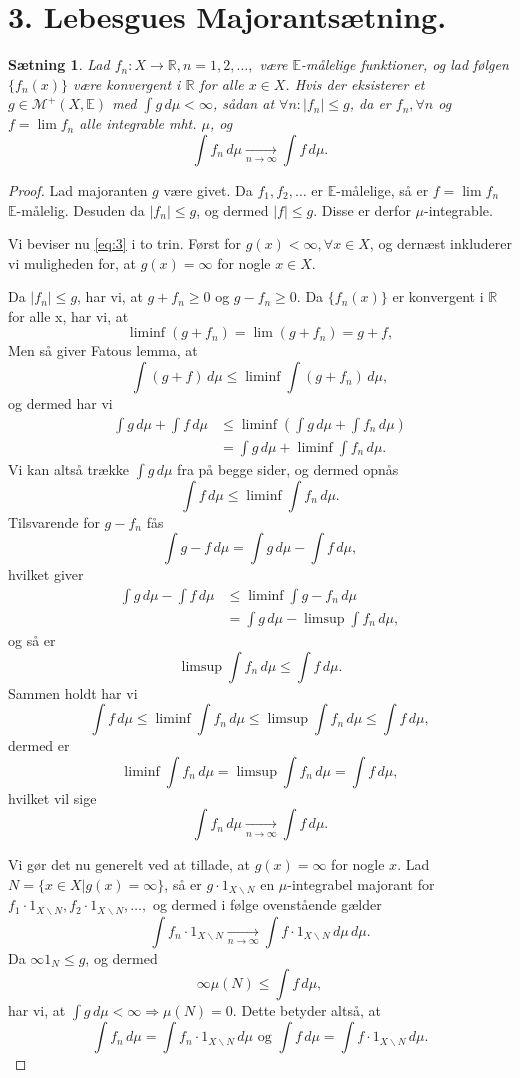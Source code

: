 \documentclass[12pt]{report}
\newtheorem{theorem}[lemma]{Sætning}
\theoremstyle{break}
\newtheorem*{proof}{Bevis}
\theoremstyle{break}
\newcommand{\Int}[1]{\int#1\,d\mu}
\newcommand{\RR}{\mathbb{R}}
\newcommand{\EE}{\mathbb{E}}
\newcommand{\M}{\mathcal{M}^+}
\begin{document}
\section*{3. Lebesgues Majorantsætning.}
\begin{theorem}
Lad $f_n\colon X\to\RR, n=1,2,\ldots,$ være $\EE$-målelige funktioner, og lad følgen $\{f_n(x)\}$ være konvergent i $\RR$ for alle $x\in X$. Hvis der eksisterer et $g\in\M(X,\EE)$ med $\int g\, d\mu<\infty$, sådan at $\forall n: \lvert f_n\rvert\leq g$, da er $f_n, \forall n$ og $f=\lim f_n$ alle integrable mht. $\mu$, og 
\begin{equation}\label{eq:3}
\int f_n \, d\mu \xrightarrow[n\to\infty]{}\int f\, d\mu.
\end{equation}
\end{theorem}
\begin{proof}
Lad majoranten $g$ være givet. Da $f_1, f_2,\ldots$ er $\EE$-målelige, så er $f= \lim f_n$ $\EE$-målelig. Desuden da $\lvert f_n\rvert\leq g$, og dermed $\lvert f\rvert\leq g$. Disse er derfor $\mu$-integrable.

\bigskip

\noindent Vi beviser nu \eqref{eq:3} i to trin. Først for $g(x)<\infty, \forall x\in X$, og dernæst inkluderer vi muligheden for, at $g(x)=\infty$ for nogle $x\in X$.

\bigskip

\noindent Da $\lvert f_n\rvert \leq g$, har vi, at $g+f_n\geq 0$ og $g-f_n\geq 0$. Da $\{f_n(x)\}$ er konvergent i $\RR$ for alle x, har vi, at
\[\liminf(g+f_n)=\lim(g+f_n)=g+f,\]
Men så giver Fatous lemma, at
\[\int (g+f) \, d\mu\leq\liminf\int(g+f_n)\,d\mu,\]
og dermed har vi
\begin{align*}
\Int{g}+\Int{f} & \leq\liminf\left(\Int{g}+\Int{f_n}\right) \\ & = \Int{g}+\liminf\Int{f_n}.
\end{align*}
Vi kan altså trække $\Int{g}$ fra på begge sider, og dermed opnås
\[\Int{f}\leq\liminf\Int{f_n}.\]
Tilsvarende for $g-f_n$ fås 
\[\Int{g-f}=\Int{g}-\Int{f},\]
hvilket giver
\begin{align*}
\Int{g}-\Int{f}&\leq\liminf\Int{g-f_n}\\&=\Int{g}-\limsup\Int{f_n},
\end{align*}
og så er
\[\limsup\Int{f_n}\leq\Int{f}.\]
Sammen holdt har vi
\[\Int{f}\leq\liminf\Int{f_n}\leq\limsup\Int{f_n}\leq\Int{f},\]
dermed er
\[\liminf\Int{f_n}=\limsup\Int{f_n}=\Int{f},\]
hvilket vil sige
\[\Int{f_n}\xrightarrow[n\to\infty]{}\Int{f}.\]

\bigskip

Vi gør det nu generelt ved at tillade, at $g(x)=\infty$ for nogle $x$. Lad $N=\{x\in X\vert g(x)=\infty\}$, så er $g\cdot 1_{X\backslash N}$ en $\mu$-integrabel majorant for $f_1\cdot 1_{X\backslash N}, f_2\cdot 1_{X\backslash N},\ldots,$ og dermed i følge ovenstående gælder
\[\Int{f_n\cdot 1_{X\backslash N}\xrightarrow[n\to\infty]{}\Int{f\cdot 1_{X\backslash N}}}.\]
Da $\infty 1_N\leq g$, og dermed \[\infty\mu(N) \leq \Int{f},\]
har vi, at $\Int{g}<\infty\Rightarrow\mu(N)=0$. Dette betyder altså, at
\[\Int{f_n}=\Int{f_n\cdot 1_{X\backslash N}}\text{ og }\Int{f}=\Int{f\cdot 1_{X\backslash N}}.\]
\end{proof}
\end{document}
